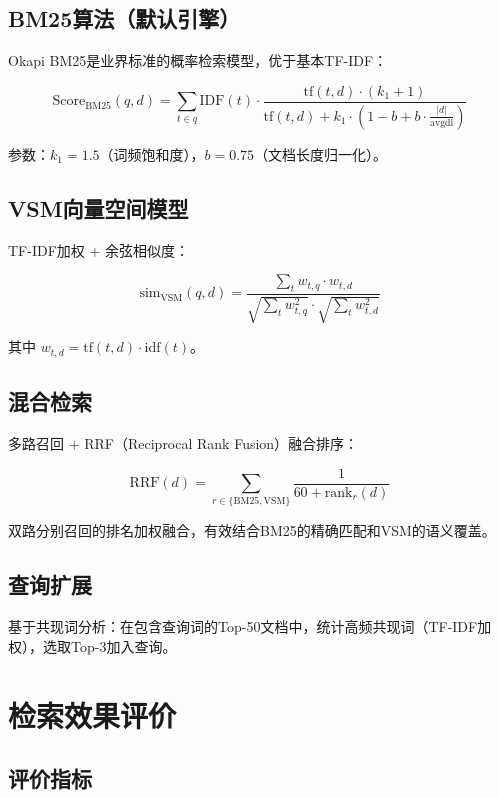 \documentclass[12pt,a4paper]{ctexart}
\begin{document}
\subsection{BM25算法（默认引擎）}

Okapi BM25是业界标准的概率检索模型，优于基本TF-IDF：

\[
\text{Score}_{\text{BM25}}(q, d) = \sum_{t \in q} \text{IDF}(t) \cdot
\frac{\text{tf}(t,d) \cdot (k_1 + 1)}{\text{tf}(t,d) + k_1 \cdot \left(1 - b + b \cdot \frac{|d|}{\text{avgdl}}\right)}
\]

参数：$k_1 = 1.5$（词频饱和度），$b = 0.75$（文档长度归一化）。

\subsection{VSM向量空间模型}

TF-IDF加权 + 余弦相似度：

\[
\text{sim}_{\text{VSM}}(q, d) = \frac{\sum_{t} w_{t,q} \cdot w_{t,d}}
{\sqrt{\sum_t w_{t,q}^2} \cdot \sqrt{\sum_t w_{t,d}^2}}
\]

其中 $w_{t,d} = \text{tf}(t,d) \cdot \text{idf}(t)$。

\subsection{混合检索}

多路召回 + RRF（Reciprocal Rank Fusion）融合排序：

\[
\text{RRF}(d) = \sum_{r \in \{\text{BM25}, \text{VSM}\}} \frac{1}{60 + \text{rank}_r(d)}
\]

双路分别召回的排名加权融合，有效结合BM25的精确匹配和VSM的语义覆盖。

\subsection{查询扩展}

基于共现词分析：在包含查询词的Top-50文档中，统计高频共现词（TF-IDF加权），选取Top-3加入查询。

\section{检索效果评价}

\subsection{评价指标}
\end{document}
